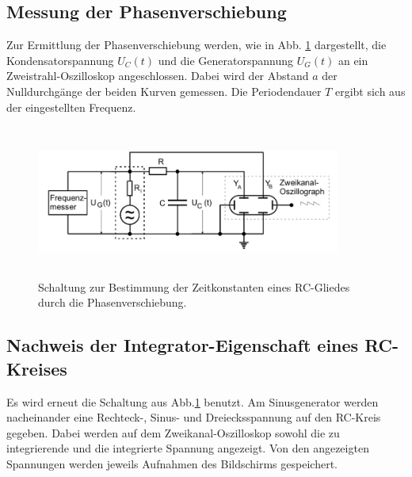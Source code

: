 \subsection{Messung der Phasenverschiebung}
Zur Ermittlung der Phasenverschiebung werden, wie in Abb. \ref{fig:4c} dargestellt, die Kondensatorspannung $U_{C}(t)$ 
und die Generatorspannung $U_{G}(t)$ an ein Zweistrahl-Oszilloskop angeschlossen. Dabei wird der Abstand $a$ der 
Nulldurchgänge der beiden Kurven gemessen. Die Periodendauer $T$ ergibt sich aus der eingestellten Frequenz.%
\begin{figure}
  \centering
  \includegraphics[width= 10cm, height=5cm]{build/4c.png}
  \caption{Schaltung zur Bestimmung der Zeitkonstanten eines RC-Gliedes durch die Phasenverschiebung.\cite{versuch}}
  \label{fig:4c}
\end{figure}

\subsection{Nachweis der Integrator-Eigenschaft eines RC-Kreises}
Es wird erneut die Schaltung aus Abb.\ref{fig:4c} benutzt. Am Sinusgenerator werden nacheinander eine Rechteck-, 
Sinus- und Dreiecksspannung auf den RC-Kreis gegeben. Dabei werden auf dem Zweikanal-Oszilloskop sowohl die 
zu integrierende und die integrierte Spannung angezeigt. Von den angezeigten Spannungen werden jeweils Aufnahmen
des Bildschirms gespeichert. 
